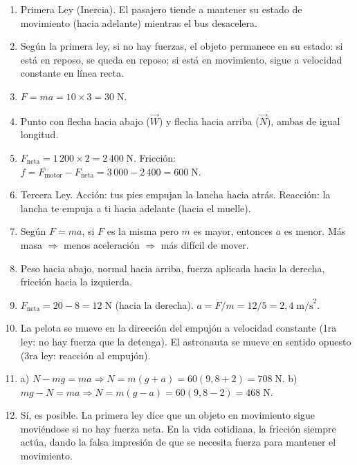 \documentclass[12pt, letterpaper]{article}
\begin{document}
  \begin{enumerate}[leftmargin=*, label=\textbf{\arabic*.}]
    \item Primera Ley (Inercia). El pasajero tiende a mantener su estado de movimiento (hacia adelante) mientras el bus desacelera.

    \item Según la primera ley, si no hay fuerzas, el objeto permanece en su estado: si está en reposo, se queda en reposo; si está en movimiento, sigue a velocidad constante en línea recta.

    \item $F = ma = 10 \times 3 = 30\;\text{N}$.

    \item Punto con flecha hacia abajo ($\vec{W}$) y flecha hacia arriba ($\vec{N}$), ambas de igual longitud.

    \item $F_{\text{neta}} = 1\,200 \times 2 = 2\,400\;\text{N}$. Fricción: $f = F_{\text{motor}} - F_{\text{neta}} = 3\,000 - 2\,400 = 600\;\text{N}$.

    \item Tercera Ley. Acción: tus pies empujan la lancha hacia atrás. Reacción: la lancha te empuja a ti hacia adelante (hacia el muelle).

    \item Según $F = ma$, si $F$ es la misma pero $m$ es mayor, entonces $a$ es menor. Más masa $\Rightarrow$ menos aceleración $\Rightarrow$ más difícil de mover.

    \item Peso hacia abajo, normal hacia arriba, fuerza aplicada hacia la derecha, fricción hacia la izquierda.

    \item $F_{\text{neta}} = 20 - 8 = 12\;\text{N}$ (hacia la derecha). $a = F/m = 12/5 = 2{,}4\;\text{m/s}^2$.

    \item La pelota se mueve en la dirección del empujón a velocidad constante (1ra ley: no hay fuerza que la detenga). El astronauta se mueve en sentido opuesto (3ra ley: reacción al empujón).

    \item a) $N - mg = ma \Rightarrow N = m(g + a) = 60(9{,}8 + 2) = 708\;\text{N}$. b) $mg - N = ma \Rightarrow N = m(g - a) = 60(9{,}8 - 2) = 468\;\text{N}$.

    \item Sí, es posible. La primera ley dice que un objeto en movimiento sigue moviéndose si no hay fuerza neta. En la vida cotidiana, la fricción siempre actúa, dando la falsa impresión de que se necesita fuerza para mantener el movimiento.
  \end{enumerate}
\end{document}
